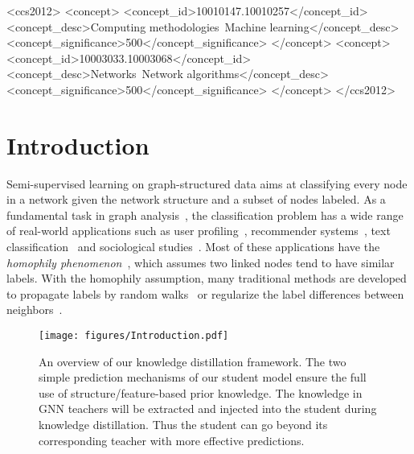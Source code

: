 \documentclass[sigconf]{acmart}
\begin{document}
\begin{CCSXML}
 <ccs2012>
 <concept>
 <concept_id>10010147.10010257</concept_id>
 <concept_desc>Computing methodologies~Machine learning</concept_desc>
 <concept_significance>500</concept_significance>
 </concept>
 <concept>
 <concept_id>10003033.10003068</concept_id>
 <concept_desc>Networks~Network algorithms</concept_desc>
 <concept_significance>500</concept_significance>
 </concept>
 </ccs2012>
\end{CCSXML}




\maketitle


\section{Introduction}
Semi-supervised learning on graph-structured data aims at classifying every node in a network given the network structure and a subset of nodes labeled. As a fundamental task in graph analysis~\cite{bhagat2011node}, the classification problem has a wide range of real-world applications such as user profiling~\cite{li2014user}, recommender systems~\cite{tang2009scalable}, text classification~\cite{aggarwal2012survey} and sociological studies~\cite{altenburger2017bias}. Most of these applications have the \textit{homophily phenomenon}~\cite{mcpherson2001birds}, which assumes two linked nodes tend to have similar labels. With the homophily assumption, many traditional methods are developed to propagate labels by random walks~\cite{szummer2002partially,zhu2003semi} or regularize the label differences between neighbors~\cite{joachims2003transductive,zhou2004learning}.

\begin{figure}[t]
    \centering
    \texttt{[image: figures/Introduction.pdf]}
    \caption{An overview of our knowledge distillation framework. The two simple prediction mechanisms of our student model ensure the full use of structure/feature-based prior knowledge. The knowledge in GNN teachers will be extracted and injected into the student during knowledge distillation. Thus the student can go beyond its corresponding teacher with more effective predictions.}
    \label{fig:intro}
\end{figure}
\end{document}
